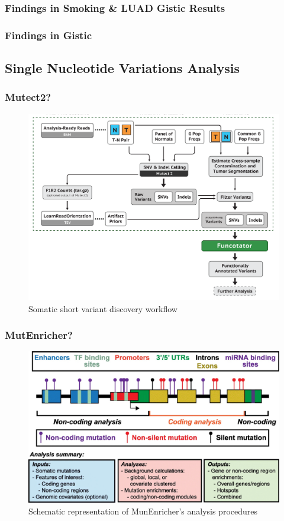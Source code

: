 \documentclass{beamer}
\begin{document}
    \begin{frame}
        \frametitle{Findings in Smoking \& LUAD Gistic Results}
    \end{frame}

    \begin{frame}
        \frametitle{Findings in Gistic}
    \end{frame}

    \subsection{Single Nucleotide Variations Analysis}
    \begin{frame}
        \frametitle{Mutect2?}

        \begin{figure}
            \includegraphics[width=0.6 \linewidth]{figures/Workflow/somatic_short_variants.png}
            \caption{Somatic short variant discovery workflow \protect\cite{gatk1, gatk2}}
        \end{figure}
    \end{frame}

    \begin{frame}
        \frametitle{MutEnricher?}

        \begin{figure}
            \includegraphics[width=0.8 \linewidth]{figures/Workflow/MutEnricher.jpg}
            \caption{Schematic representation of MunEnricher's analysis procedures \protect\cite{MutEnricher1}}
        \end{figure}
    \end{frame}
\end{document}

